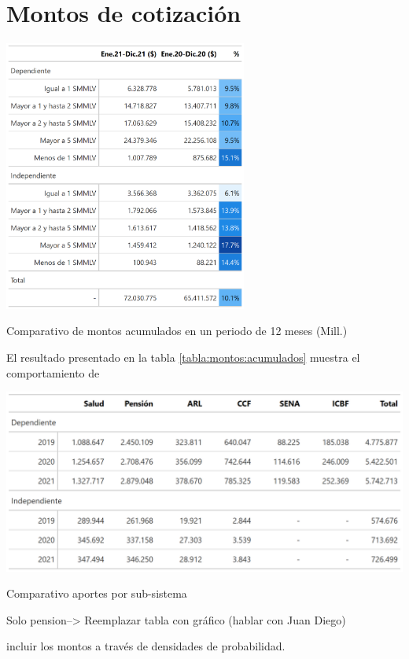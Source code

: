 \section{Montos de cotización}

\begin{table}
\includegraphics[width = 8cm]{results/03_financiero/salida_montos_cotizacion_interes_coomparativo.png}
\caption{Comparativo de montos acumulados en un periodo de 12
meses (Mill.)}
\label{tabla:montos:acumulados}
\end{table}

El resultado presentado en la tabla \ref{tabla:montos:acumulados} muestra el comportamiento de 

\lipsum[2-4]


\begin{table}[!h]
\centering
\includegraphics[width = 15cm]{results/03_financiero/salida_montos_cotizacion_subsistema.png}
\caption{Comparativo aportes por sub-sistema}%
\label{tabla:montos:sub_sistemas}
\end{table}



Solo pension--> Reemplazar tabla con gráfico (hablar con Juan Diego) 

incluir los montos a través de densidades de probabilidad. 


